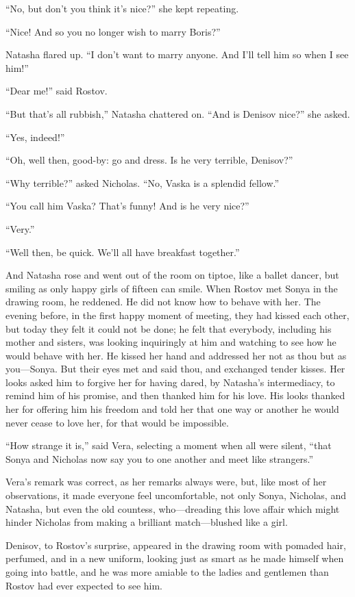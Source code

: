 ``No, but don't you think it's nice?'' she kept repeating.

``Nice! And so you no longer wish to marry Boris?''

Natasha flared up. ``I don't want to marry anyone. And I'll tell
him so when I see him!''

``Dear me!'' said Rostov.

``But that's all rubbish,'' Natasha chattered on. ``And is
Denisov nice?''  she asked.

``Yes, indeed!''

``Oh, well then, good-by: go and dress. Is he very terrible,
Denisov?''

``Why terrible?'' asked Nicholas. ``No, Vaska is a splendid
fellow.''

``You call him Vaska? That's funny! And is he very nice?''

``Very.''

``Well then, be quick. We'll all have breakfast together.''

And Natasha rose and went out of the room on tiptoe, like a
ballet dancer, but smiling as only happy girls of fifteen can
smile. When Rostov met Sonya in the drawing room, he reddened. He
did not know how to behave with her. The evening before, in the
first happy moment of meeting, they had kissed each other, but
today they felt it could not be done; he felt that everybody,
including his mother and sisters, was looking inquiringly at him
and watching to see how he would behave with her. He kissed her
hand and addressed her not as thou but as you---Sonya.  But their
eyes met and said thou, and exchanged tender kisses. Her looks
asked him to forgive her for having dared, by Natasha's
intermediacy, to remind him of his promise, and then thanked him
for his love. His looks thanked her for offering him his freedom
and told her that one way or another he would never cease to love
her, for that would be impossible.

``How strange it is,'' said Vera, selecting a moment when all
were silent, ``that Sonya and Nicholas now say you to one another
and meet like strangers.''

Vera's remark was correct, as her remarks always were, but, like
most of her observations, it made everyone feel uncomfortable,
not only Sonya, Nicholas, and Natasha, but even the old countess,
who---dreading this love affair which might hinder Nicholas from
making a brilliant match---blushed like a girl.

Denisov, to Rostov's surprise, appeared in the drawing room with
pomaded hair, perfumed, and in a new uniform, looking just as
smart as he made himself when going into battle, and he was more
amiable to the ladies and gentlemen than Rostov had ever expected
to see him.

